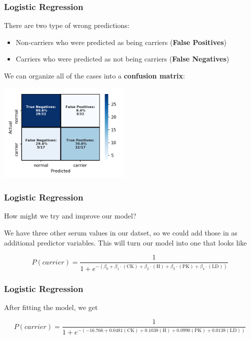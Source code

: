 \documentclass[11pt, table]{beamer}
\newcommand{\p}{\pause}
\begin{document}
\begin{frame}
\frametitle{Logistic Regression}
There are two type of wrong predictions:\p
\begin{itemize}
	\item Non-carriers who were predicted as being carriers (\textbf{False Positives})\p
	\item Carriers who were predicted as not being carriers (\textbf{False Negatives})\p
\end{itemize}
We can organize all of the cases into a \textbf{confusion matrix}:

\begin{center}
	\includegraphics[width=2.5in]{images/Dystrophy/cm.png}
\end{center}
\end{frame}

\begin{frame}
\frametitle{Logistic Regression}
How might we try and improve our model?
\vspace{0.1in}

We have three other serum values in our datset, so we could add those in as additional predictor variables. This will turn our model into one that looks like

$$P(carrier) = \frac{1}{1 + e^{-(\beta_0 + \beta_1\cdot(\text{CK}) + \beta_2\cdot(\text{H}) + \beta_3\cdot(\text{PK}) + \beta_4\cdot(\text{LD}))}}$$
\end{frame}

\begin{frame}
\frametitle{Logistic Regression}
After fitting the model, we get

$$P(carrier) = \frac{1}{1 + e^{-(-16.766 + 0.0481(\text{CK}) + 0.1038(\text{H}) + 0.0990(\text{PK}) + 0.0138(\text{LD}))}}$$
\end{frame}
\end{document}
